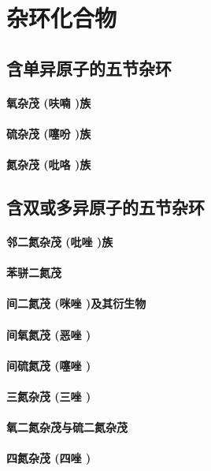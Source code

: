 \documentclass[UTF8]{../03-Chemistry}
\begin{document}
\chapter{杂环化合物}
\section{含单异原子的五节杂环}
    \subsubsection{氧杂茂 (呋喃 )族}
    \subsubsection{硫杂茂 (噻吩 )族}
    \subsubsection{氮杂茂 (吡咯 )族}
\section{含双或多异原子的五节杂环}
    \subsubsection{邻二氮杂茂 (吡唑 )族}
    \subsubsection{苯骈二氮茂}
    \subsubsection{间二氮茂 (咪唑 )及其衍生物}
    \subsubsection{间氧氮茂 (恶唑 )}
    \subsubsection{间硫氮茂 (噻唑 )}
    \subsubsection{三氮杂茂 (三唑 )}
    \subsubsection{氧二氮杂茂与硫二氮杂茂}
    \subsubsection{四氮杂茂 (四唑 )}
\end{document}
